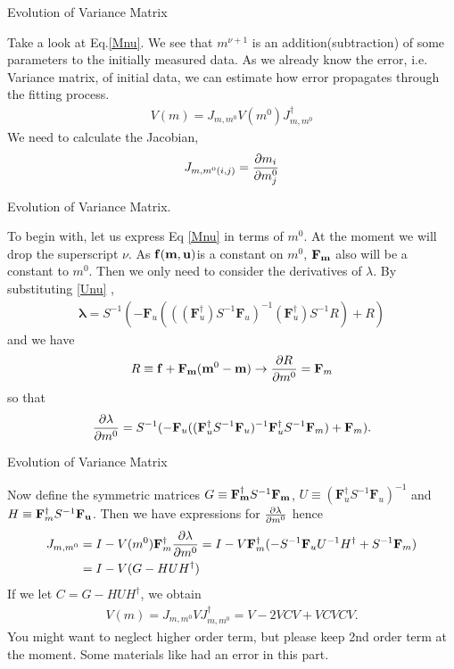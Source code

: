 \documentclass[
	xcolor=dvipsnames,
	10pt, 
	]{beamer}
\begin{document}
\begin{frame}{Evolution of Variance Matrix}
	\begin{block}{}
		Take a look at Eq.\eqref{Mnu}. We see that $m^{\nu+1} $ is an addition(subtraction) of some parameters to the initially measured data. As we already know the error, i.e. Variance matrix, of initial data, we can estimate how error propagates through the fitting process. 
		\begin{align}
			V(m) = J_{m,m^0}V(m^0)J_{m,m^0}^\dagger
		\end{align}
		We need to calculate the Jacobian, 
		\begin{align}
			J_{m,m^0(i,j)} = \frac{\partial m_i}{\partial m^0_j}
		\end{align}
	\end{block}
\end{frame}
\begin{frame}{Evolution of Variance Matrix.}
	\begin{block}{}
		To begin with, let us express Eq \eqref{Mnu} in terms of $m^0$. At the moment we will drop the superscript $\nu$. As $\mathbf{f}(\mathbf{m},\mathbf{u})$is a constant on $m^0$, $\mathbf{F}_{\mathbf{m}}$ also will be a constant to $m^0$. Then we only need to consider the derivatives of $\lambda$. By substituting \eqref{Unu} ,
		\begin{align}
	\mathbf\lambda = S^{-1}(-\mathbf F_u(((\mathbf{F}_u^\dagger) S^{-1}\mathbf F_u)^{-1}(\mathbf{F}_u^\dagger) S^{-1}R) + R)
		\end{align}
		and we have
		\begin{align}
			R\equiv \mathbf f + \mathbf{F}_\mathbf{m}(\mathbf{m}^0-\mathbf{m})\to \frac{\partial R}{\partial m^0}= \mathbf{F}_m
		\end{align} 
		so that 
		\begin{align}
			\frac{\partial \lambda}{\partial m^0}= S^{-1}(-\mathbf F_u((\mathbf{F}_u^\dagger S^{-1}\mathbf F_u)^{-1}\mathbf{F}_u^\dagger S^{-1}\mathbf{F}_m) + \mathbf{F}_m).
		\end{align}
	\end{block}
\end{frame}
\begin{frame}{Evolution of Variance Matrix}
	\begin{block}{}
		Now define the symmetric matrices $G\equiv \mathbf{F_m^\dagger} S^{-1}\mathbf{F_m}$, $U\equiv (\mathbf{F}_u^\dagger S^{-1}\mathbf F_u)^{-1}$ and $H\equiv \mathbf{F}_m^\dagger S^{-1}\mathbf{F_u}$. Then we have expressions for $\frac{\partial \lambda}{\partial m^0}$ hence 
		\begin{align}
			J_{m,m^0}&=I - V(m^0)\mathbf{F}_m^\dagger\frac{\partial \lambda}{\partial m^0}=I - V\mathbf{F}^\dagger_m(-S^{-1}\mathbf{F}_u U^{-1}H^\dagger+S^{-1}\mathbf{F}_m)\nonumber\\
			&=I-V(G-HUH^\dagger)
		\end{align}
		If we let $C =G-HUH^\dagger$, we obtain
		\begin{align}
			V(m) = J_{m,m^0} VJ_{m,m^0}^\dagger =V -2 VCV  +VCVCV.\label{Vm}
		\end{align}
		You might want to neglect higher order term, but please keep 2nd order term at the moment. Some materials like \cite{Prob} had an error in this part.
	\end{block}
\end{frame}
\end{document}
